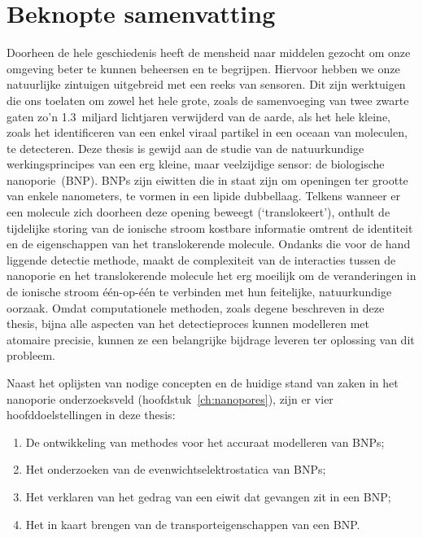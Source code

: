 \chapter{Beknopte samenvatting}
%
\label{ch:abstractnl}
%

Doorheen de hele geschiedenis heeft de mensheid naar middelen gezocht om onze omgeving beter te kunnen
beheersen en te begrijpen. Hiervoor hebben we onze natuurlijke zintuigen uitgebreid met een reeks van
sensoren. Dit zijn werktuigen die ons toelaten om zowel het hele grote, zoals de samenvoeging van twee zwarte
gaten zo'n \num{1.3}~miljard lichtjaren verwijderd van de aarde, als het hele kleine, zoals het identificeren
van een enkel viraal partikel in een oceaan van moleculen, te detecteren. Deze thesis is gewijd aan de studie
van de natuurkundige werkingsprincipes van een erg kleine, maar veelzijdige sensor: de biologische
nanoporie~(BNP). BNPs zijn eiwitten die in staat zijn om openingen ter grootte van enkele nanometers, te
vormen in een lipide dubbellaag. Telkens wanneer er een molecule zich doorheen deze opening beweegt
(`translokeert'), onthult de tijdelijke storing van de ionische stroom kostbare informatie omtrent de
identiteit en de eigenschappen van het translokerende molecule. Ondanks die voor de hand liggende detectie
methode, maakt de complexiteit van de interacties tussen de nanoporie en het translokerende molecule het erg
moeilijk om de veranderingen in de ionische stroom \'{e}\'{e}n-op-\'{e}\'{e}n te verbinden met hun feitelijke,
natuurkundige oorzaak. Omdat computationele methoden, zoals degene beschreven in deze thesis, bijna alle
aspecten van het detectieproces kunnen modelleren met atomaire precisie, kunnen ze een belangrijke bijdrage
leveren ter oplossing van dit probleem.

Naast het oplijsten van nodige concepten en de huidige stand van zaken in het nanoporie onderzoeksveld
(hoofdstuk~\ref{ch:nanopores}), zijn er vier hoofddoelstellingen in deze thesis:
%
\begin{enumerate}
  \item De ontwikkeling van methodes voor het accuraat modelleren van BNPs;
  \item Het onderzoeken van de evenwichtselektrostatica van BNPs;  
  \item Het verklaren van het gedrag van een eiwit dat gevangen zit in een BNP;
  \item Het in kaart brengen van de transporteigenschappen van een BNP.
\end{enumerate}
%

